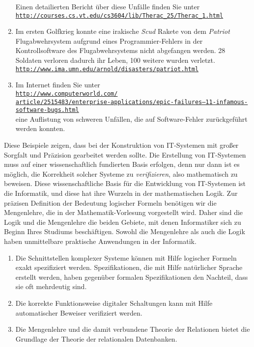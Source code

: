 \begin{enumerate}
      Einen detailierten Bericht über diese Unfälle finden Sie unter \\[0.1cm]
      \hspace*{1.3cm} 
      \href{http://courses.cs.vt.edu/~cs3604/lib/Therac_25/Therac_1.html}{\texttt{http://courses.cs.vt.edu/cs3604/lib/Therac\_25/Therac\_1.html}}
\item Im ersten Golfkrieg konnte eine irakische \textsl{Scud} Rakete von dem \textsl{Patriot} Flugabwehrsystem
      aufgrund eines Programmier-Fehlers in der Kontrollsoftware des Flugabwehrsystems
      nicht abgefangen werden.  28 Soldaten verloren dadurch ihr Leben, 100 weitere wurden
      verletzt. \\[0.1cm]
      \hspace*{1.3cm} 
      \href{http://www.ima.umn.edu/~arnold/disasters/patriot.html}{\texttt{http://www.ima.umn.edu/arnold/disasters/patriot.html}}
\item Im Internet finden Sie unter \\[0.2cm]
      \hspace*{0.0cm}
      \href{http://www.computerworld.com/article/2515483/enterprise-applications/epic-failures--11-infamous-software-bugs.html}{\texttt{http://www.computerworld.com/\\
      \hspace*{0.3cm}
        article/2515483/enterprise-applications/epic-failures--11-infamous-software-bugs.html}}
      \\[0.2cm]
      eine Auflistung von schweren Unfällen, die auf Software-Fehler zurückgeführt werden konnten.
\end{enumerate}
Diese Beispiele zeigen, dass bei der Konstruktion von IT-Systemen mit großer Sorgfalt
und Präzision gearbeitet werden sollte.  Die Erstellung von IT-Systemen muss auf einer 
wissenschaftlich fundierten Basis erfolgen, denn nur dann ist es möglich, die Korrekheit
solcher Systeme zu \emph{verifizieren}, also mathematisch zu beweisen.
Diese wissenschaftliche Basis für die Entwicklung von IT-Systemen ist die Informatik, 
und diese hat ihre Wurzeln in der mathematischen Logik.  Zur präzisen Definition der
Bedeutung logischer Formeln benötigen wir die Mengenlehre, die in der Mathematik-Vorlesung
vorgestellt wird.  Daher sind die Logik und die Mengenlehre die beiden Gebiete, mit denen 
Informatiker sich zu Beginn Ihres Studiums beschäftigen.  Sowohl die Mengenlehre als auch die Logik
haben unmittelbare praktische Anwendungen in der Informatik.
\begin{enumerate}
\item Die Schnittstellen komplexer Systeme können mit Hilfe logischer Formeln
      exakt spezifiziert werden.  Spezifikationen, die mit Hilfe natürlicher Sprache
      erstellt werden, haben gegenüber formalen Spezifikationen den Nachteil,
      dass sie oft mehrdeutig sind.
\item Die korrekte Funktionsweise digitaler Schaltungen kann mit Hilfe automatischer
      Beweiser verifiziert werden.  
\item Die Mengenlehre und die damit verbundene Theorie der Relationen bietet die Grundlage
      der Theorie der relationalen Datenbanken.  
\end{enumerate}

